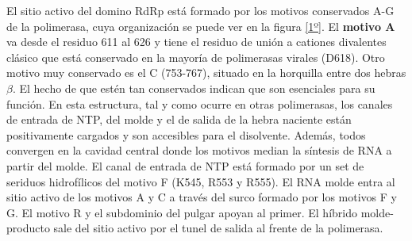 \documentclass[a4paper,11pt]{report}
\begin{document}
El sitio activo del domino RdRp está formado por los motivos conservados A-G de la polimerasa, cuya organización se puede ver en la figura \ref{1º}. El \textbf{motivo A} va desde el residuo 611 al 626 y tiene el residuo de unión a cationes divalentes clásico que está conservado en la mayoría de polimerasas virales (D618). Otro motivo muy conservado es el C (753-767), situado en la horquilla entre dos hebras $\beta$.  El hecho de que estén tan conservados indican que son esenciales para su función. 
En esta estructura, tal y como ocurre en otras polimerasas, los canales de entrada de NTP, del molde y el de salida de la hebra naciente están positivamente cargados y son accesibles para el disolvente. Además, todos convergen en la cavidad central donde los motivos median la síntesis de RNA a partir del molde.
El canal de entrada de NTP está formado por un set de seriduos hidrofílicos del motivo F (K545, R553 y R555). El RNA molde entra al sitio activo de los motivos A y C a través del surco formado por los motivos F y G. El motivo R y el subdominio del pulgar apoyan al primer. El híbrido molde-producto sale del sitio activo por el tunel de salida al frente de la polimerasa. \cite{RdRp}
\end{document}
